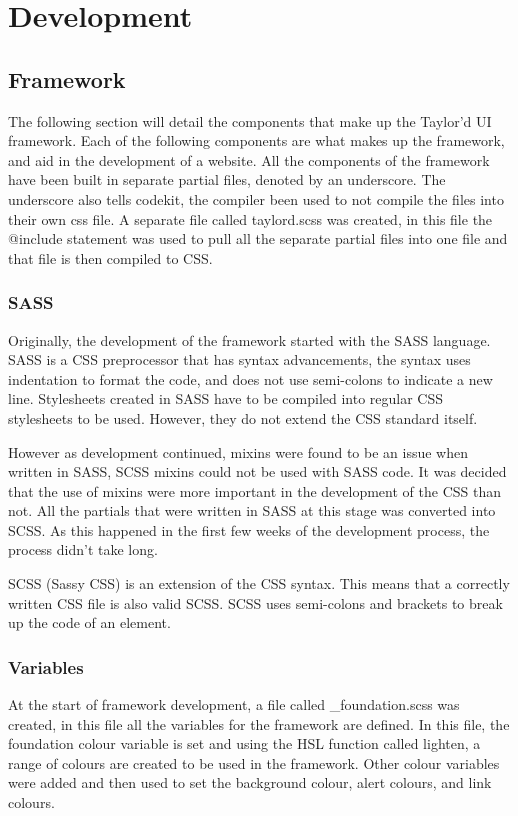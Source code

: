 \chapter*{Development}
\section*{Framework}
The following section will detail the components that make up the Taylor'd UI framework. Each of the following components are what makes up the framework, and aid in the development of a website. All the components of the framework have been built in separate partial files, denoted by an underscore. The underscore also tells codekit, the compiler been used to not compile the files into their own css file. A separate file called taylord.scss was created, in this file the @include statement was used to pull all the separate partial files into one file and that file is then compiled to CSS. 

\subsection*{SASS}

Originally, the development of the framework started with the SASS language. SASS is a CSS preprocessor that has syntax advancements, the syntax uses indentation to format the code, and does not use semi-colons to indicate a new line. Stylesheets created in SASS have to be compiled into regular CSS stylesheets to be used. However, they do not extend the CSS standard itself. 

However as development continued, mixins were found to be an issue when written in SASS, SCSS mixins could not be used with SASS code. It was decided that the use of mixins were more important in the development of the CSS than not. All the partials that were written in SASS at this stage was converted into SCSS. As this happened in the first few weeks of the development process, the process didn't take long. 

SCSS (Sassy CSS) is an extension of the CSS syntax. This means that a correctly written CSS file is also valid SCSS. SCSS uses semi-colons and brackets to break up the code of an element. 

\newpage
\subsection*{Variables}
At the start of framework development, a file called \_foundation.scss was created, in this file all the variables for the framework are defined. In this file, the foundation colour variable is set and using the HSL function called lighten, a range of colours are created to be used in the framework. Other colour variables were added and then used to set the background colour, alert colours, and link colours.

